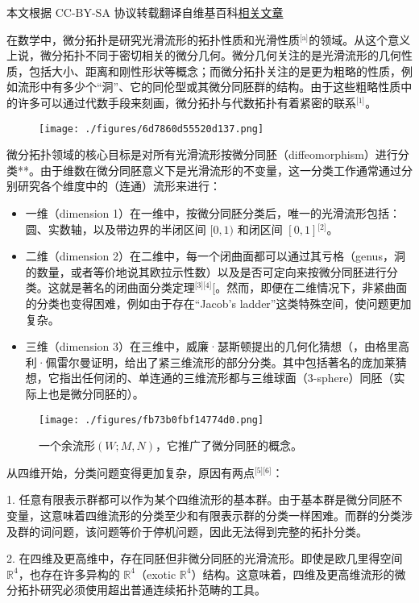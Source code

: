 
本文根据 CC-BY-SA 协议转载翻译自维基百科\href{https://en.wikipedia.org/wiki/Differential_topology}{相关文章}

在数学中，微分拓扑是研究光滑流形的拓扑性质和光滑性质\(^\text{[a]}\)的领域。从这个意义上说，微分拓扑不同于密切相关的微分几何。微分几何关注的是光滑流形的几何性质，包括大小、距离和刚性形状等概念；而微分拓扑关注的是更为粗略的性质，例如流形中有多少个“洞”、它的同伦型或其微分同胚群的结构。由于这些粗略性质中的许多可以通过代数手段来刻画，微分拓扑与代数拓扑有着紧密的联系\(^\text{[1]}\)。
\begin{figure}[ht]
\centering
\texttt{[image: ./figures/6d7860d55520d137.png]}
\caption{} \label{fig_WFTP_1}
\end{figure}
微分拓扑领域的核心目标是对所有光滑流形按微分同胚（diffeomorphism）进行分类**。由于维数在微分同胚意义下是光滑流形的不变量，这一分类工作通常通过分别研究各个维度中的（连通）流形来进行：
\begin{itemize}
\item 一维（dimension 1）在一维中，按微分同胚分类后，唯一的光滑流形包括：圆、实数轴，以及带边界的半闭区间 $[0,1)$ 和闭区间 $[0,1]$\(^\text{[2]}\)。
\item 二维（dimension 2）在二维中，每一个闭曲面都可以通过其亏格（genus，洞的数量，或者等价地说其欧拉示性数）以及是否可定向来按微分同胚进行分类。这就是著名的闭曲面分类定理\(^\text{[3][4]}\)[。然而，即便在二维情况下，非紧曲面的分类也变得困难，例如由于存在“Jacob's ladder”这类特殊空间，使问题更加复杂。
\item 三维（dimension 3）在三维中，威廉·瑟斯顿提出的几何化猜想（，由格里高利·佩雷尔曼证明，给出了紧三维流形的部分分类。其中包括著名的庞加莱猜想，它指出任何闭的、单连通的三维流形都与三维球面（3-sphere）同胚（实际上也是微分同胚的）。
\end{itemize}
\begin{figure}[ht]
\centering
\texttt{[image: ./figures/fb73b0fbf14774d0.png]}
\caption{一个余流形$(W; M, N)$，它推广了微分同胚的概念。} \label{fig_WFTP_2}
\end{figure}
从四维开始，分类问题变得更加复杂，原因有两点\(^\text{[5][6]}\)：

1. 任意有限表示群都可以作为某个四维流形的基本群。由于基本群是微分同胚不变量，这意味着四维流形的分类至少和有限表示群的分类一样困难。而群的分类涉及群的词问题，该问题等价于停机问题，因此无法得到完整的拓扑分类。

2. 在四维及更高维中，存在同胚但非微分同胚的光滑流形。即使是欧几里得空间 $\mathbb{R}^4$，也存在许多异构的 $\mathbb{R}^4$（exotic $\mathbb{R}^4$）结构。这意味着，四维及更高维流形的微分拓扑研究必须使用超出普通连续拓扑范畴的工具。

